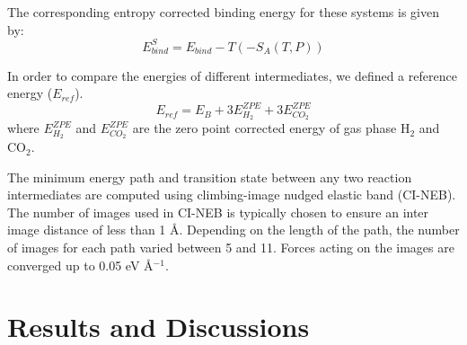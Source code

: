 The corresponding entropy corrected binding energy for these systems is given by: 
\begin{equation}
E_{bind}^{S} = E_{bind}  - T   (-S_{A} (T,P))
 \label{ebind}
\end{equation}

In order to compare the energies of different intermediates, we defined a reference energy ($E_{ref}$). 
\begin{equation}
 E_{ref} = E_{B} + 3 E^{ZPE}_{H_2} +  3 E^{ZPE}_{CO_2}  
 \label{eref}
\end{equation}
\noindent where $E^{ZPE}_{H_2}$ and  $E^{ZPE}_{CO_2}$ are the zero point corrected energy of gas phase H$_2$ and CO$_2$. 
 
The minimum energy path and transition state between any two reaction intermediates are computed using climbing-image nudged elastic band (CI-NEB). The number of images used in CI-NEB is typically chosen to ensure an inter image distance of less than 1 \AA. Depending on the length of the path, the number of images for each path varied between 5 and 11. Forces acting on the images are converged up to 0.05 eV {\AA$^{-1}$}.

\section{Results and Discussions}
\label{resultse}


